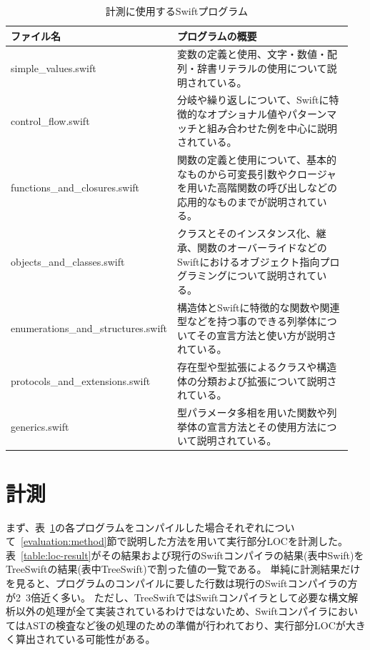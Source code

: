\begin{table}[!hbtp]
    \begin{center}
        \caption{計測に使用するSwiftプログラム}
        \begin{tabular}{|p{0.4\linewidth}|p{0.55\linewidth}|}
            \hline
            ファイル名 & プログラムの概要\\
            \hline
            \hline
            simple\_values.swift & 変数の定義と使用、文字・数値・配列・辞書リテラルの使用について説明されている。\\
            \hline
            control\_flow.swift & 分岐や繰り返しについて、Swiftに特徴的なオプショナル値やパターンマッチと組み合わせた例を中心に説明されている。\\
            \hline
            functions\_and\_closures.swift & 関数の定義と使用について、基本的なものから可変長引数やクロージャを用いた高階関数の呼び出しなどの応用的なものまでが説明されている。\\
            \hline
            objects\_and\_classes.swift & クラスとそのインスタンス化、継承、関数のオーバーライドなどのSwiftにおけるオブジェクト指向プログラミングについて説明されている。\\
            \hline
            enumerations\_and\_structures.swift & 構造体とSwiftに特徴的な関数や関連型などを持つ事のできる列挙体についてその宣言方法と使い方が説明されている。\\
            \hline
            protocols\_and\_extensions.swift & 存在型や型拡張によるクラスや構造体の分類および拡張について説明されている。\\
            \hline
            generics.swift & 型パラメータ多相を用いた関数や列挙体の宣言方法とその使用方法について説明されている。\\
            \hline
        \end{tabular}
        \label{table:complexity-measure}
    \end{center}
\end{table}

\section{計測}

まず、表~\ref{table:complexity-measure}の各プログラムをコンパイルした場合それぞれについて~\ref{evaluation:method}節で説明した方法を用いて実行部分LOCを計測した。
表~\ref{table:loc-result}がその結果および現行のSwiftコンパイラの結果(表中Swift)をTreeSwiftの結果(表中TreeSwift)で割った値の一覧である。
単純に計測結果だけを見ると、プログラムのコンパイルに要した行数は現行のSwiftコンパイラの方が2~3倍近く多い。
ただし、TreeSwiftではSwiftコンパイラとして必要な構文解析以外の処理が全て実装されているわけではないため、SwiftコンパイラにおいてはASTの検査など後の処理のための準備が行われており、実行部分LOCが大きく算出されている可能性がある。

